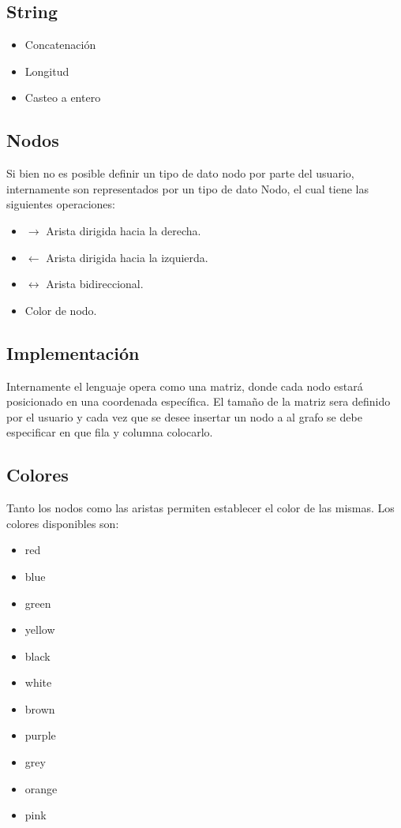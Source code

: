 \documentclass{article}
\begin{document}
	\subsection{String}
	\begin{itemize}
		\item Concatenación
	    \item Longitud
	    \item Casteo a entero
	\end{itemize}
    \subsection{Nodos}
    Si bien no es posible definir un tipo de dato nodo por parte del usuario, 
    internamente son representados por un tipo de dato Nodo, el cual tiene las siguientes operaciones:
    \begin{itemize}
       \item{$\rightarrow$ Arista dirigida hacia la derecha.}
       \item{$\leftarrow$ Arista dirigida hacia la izquierda.}
       \item{$\leftrightarrow$ Arista bidireccional.}
       \item Color de nodo.
    \end{itemize}
    \subsection{Implementación}
    Internamente el lenguaje opera como una matriz, donde cada nodo estará posicionado en una coordenada específica.
    El tamaño de la matriz sera definido por el usuario y cada vez que se desee insertar un nodo a al grafo se debe
    especificar en que fila y columna colocarlo.
    \subsection{Colores}
    Tanto los nodos como las aristas permiten establecer el color de las mismas. Los colores disponibles son:
    \begin{itemize}
        \color{red}
        \item red
        \color{blue}
        \item blue
        \color{green}
        \item green
        \color{yellow}
        \item yellow
        \color{black}
        \item black
        \color{black}
        \item white
        \color{brown}
        \item brown
        \color{purple}
        \item purple
        \color{gray}
        \item grey
        \color{orange}
        \item orange
        \color{pink}
        \item pink
    \end{itemize}
\end{document}
